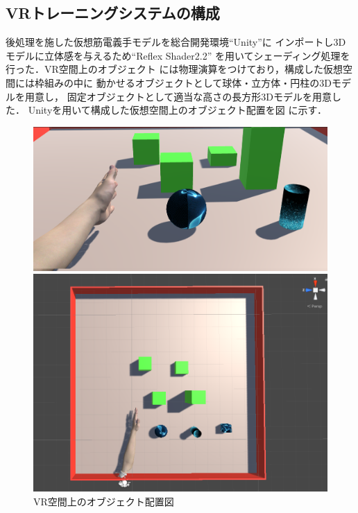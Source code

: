 \documentclass{ltjsarticle}
\begin{document}
	\subsection{VRトレーニングシステムの構成}
		後処理を施した仮想筋電義手モデルを総合開発環境``Unity''に
		インポートし3Dモデルに立体感を与えるため``Reflex Shader2.2''
		を用いてシェーディング処理を行った．VR空間上のオブジェクト
		には物理演算をつけており，構成した仮想空間には枠組みの中に
		動かせるオブジェクトとして球体・立方体・円柱の3Dモデルを用意し，
		固定オブジェクトとして適当な高さの長方形3Dモデルを用意した．
		Unityを用いて構成した仮想空間上のオブジェクト配置を図
		に示す．

		\begin{figure}[H]
		\centering
		\begin{minipage}{0.521\columnwidth}
		\centering
		\includegraphics[width = \columnwidth]{figs/gamescreen.png}
		\end{minipage}
		\hspace{0.05\columnwidth}
		\begin{minipage}{0.4\columnwidth}
		\centering
		\includegraphics[width = \columnwidth]{figs/fieldup.png}
		\end{minipage}
		\vspace{-10pt}
		\caption{VR空間上のオブジェクト配置図}
		\label{fig:gamefield}
		\end{figure}
		\vspace{-20pt}
\end{document}
